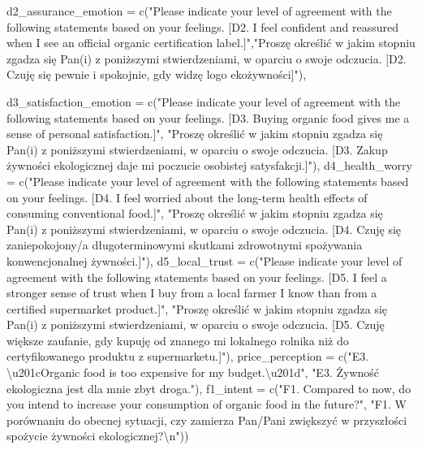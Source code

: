 \documentclass[
  letterpaper,
  DIV=11,
  numbers=noendperiod]{scrartcl}
\newenvironment{Shaded}{\begin{snugshade}}{\end{snugshade}}
\newcommand{\AttributeTok}[1]{\textcolor[rgb]{0.40,0.45,0.13}{#1}}
\newcommand{\FunctionTok}[1]{\textcolor[rgb]{0.28,0.35,0.67}{#1}}
\newcommand{\NormalTok}[1]{\textcolor[rgb]{0.00,0.23,0.31}{#1}}
\newcommand{\SpecialCharTok}[1]{\textcolor[rgb]{0.37,0.37,0.37}{#1}}
\newcommand{\StringTok}[1]{\textcolor[rgb]{0.13,0.47,0.30}{#1}}
\begin{document}
\begin{Shaded}
\begin{Highlighting}[]
\AttributeTok{d2\_assurance\_emotion  =} \FunctionTok{c}\NormalTok{(}\StringTok{"Please indicate your level of agreement with the following statements based on your feelings. [D2. I feel confident and reassured when I see an official organic certification label.]"}\NormalTok{,}\StringTok{"Proszę określić w jakim stopniu zgadza się Pan(i) z poniższymi stwierdzeniami, w oparciu o swoje odczucia. [D2. Czuję się pewnie i spokojnie, gdy widzę logo ekożywności]"}\NormalTok{),}

  \AttributeTok{d3\_satisfaction\_emotion =} \FunctionTok{c}\NormalTok{(}\StringTok{"Please indicate your level of agreement with the following statements based on your feelings. [D3. Buying organic food gives me a sense of personal satisfaction.]"}\NormalTok{, }\StringTok{"Proszę określić w jakim stopniu zgadza się Pan(i) z poniższymi stwierdzeniami, w oparciu o swoje odczucia. [D3. Zakup żywności ekologicznej daje mi poczucie osobistej satysfakcji.]"}\NormalTok{),}
\AttributeTok{d4\_health\_worry =} \FunctionTok{c}\NormalTok{(}\StringTok{"Please indicate your level of agreement with the following statements based on your feelings. [D4. I feel worried about the long{-}term health effects of consuming conventional food.]"}\NormalTok{, }\StringTok{"Proszę określić w jakim stopniu zgadza się Pan(i) z poniższymi stwierdzeniami, w oparciu o swoje odczucia. [D4. Czuję się zaniepokojony/a długoterminowymi skutkami zdrowotnymi spożywania konwencjonalnej żywności.]"}\NormalTok{), }
\AttributeTok{d5\_local\_trust =} \FunctionTok{c}\NormalTok{(}\StringTok{"Please indicate your level of agreement with the following statements based on your feelings. [D5. I feel a stronger sense of trust when I buy from a local farmer I know than from a certified supermarket product.]"}\NormalTok{, }\StringTok{"Proszę określić w jakim stopniu zgadza się Pan(i) z poniższymi stwierdzeniami, w oparciu o swoje odczucia. [D5. Czuję większe zaufanie, gdy kupuję od znanego mi lokalnego rolnika niż do certyfikowanego produktu z supermarketu.]"}\NormalTok{), }
\AttributeTok{price\_perception =} \FunctionTok{c}\NormalTok{(}\StringTok{"E3. \textbackslash{}u201cOrganic food is too expensive for my budget.\textbackslash{}u201d"}\NormalTok{, }\StringTok{"E3. Żywność ekologiczna jest dla mnie zbyt droga."}\NormalTok{),}
\AttributeTok{f1\_intent =} \FunctionTok{c}\NormalTok{(}\StringTok{"F1. Compared to now, do you intend to increase your consumption of organic food in the future?"}\NormalTok{, }\StringTok{"F1. W porównaniu do obecnej sytuacji, czy zamierza Pan/Pani zwiększyć w przyszłości spożycie żywności ekologicznej?}\SpecialCharTok{\textbackslash{}n}\StringTok{"}\NormalTok{))}


\end{Highlighting}
\end{Shaded}
\end{document}
